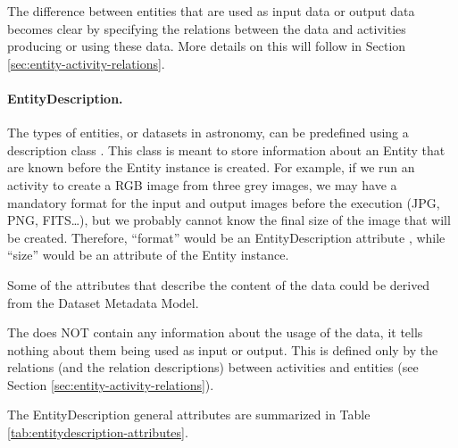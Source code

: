 

The difference between entities that are used as input data or output data 
becomes clear by specifying the relations between the data and activities producing or using these data.
More details on this will follow in Section \ref{sec:entity-activity-relations}.

\paragraph{EntityDescription.}
The types of entities, or datasets in astronomy, can be predefined using a description class .
This class is meant to store information about an Entity that are known before the Entity instance is created. For example, if we run an activity to create a RGB image from three grey images, we may have a mandatory format for the input and output images before the execution (JPG, PNG, FITS\dots), but we probably cannot know the final size of the image  that will be created. Therefore, ``format'' would be an EntityDescription attribute , while ``size'' would be an attribute of the Entity instance. 

Some of the attributes that describe the content of the data could be derived from 
the Dataset Metadata Model.

The  does NOT contain any information about the usage 
of the data, it tells nothing about them being used as input or output. This is 
defined only by the relations (and the relation descriptions) between activities
and entities (see Section \ref{sec:entity-activity-relations}).

The EntityDescription general attributes are summarized in Table 
\ref{tab:entitydescription-attributes}.


